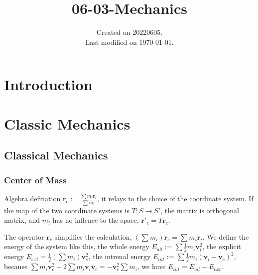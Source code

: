 \documentclass[UTF8]{../06-Physics}
\begin{document}
\title{06-03-Mechanics}
\date{Created on 20220605.\\   Last modified on \today.}
\maketitle
\tableofcontents


\chapter{Introduction}


\chapter{Classic Mechanics}

\section{Classical Mechanics}


\subsection{Center of Mass}

Algebra defination $\boldsymbol r_c := \frac{\sum m_i \boldsymbol r_i}{\sum m_i} $, it relays to the choice of the coordinate system. If the map of the two coordinate systems is $T: S \rightarrow S'$, the matrix is orthogonal matrix, and $m_i$ has no inflence to the space, $\boldsymbol r'_c = T\boldsymbol r_c$.

The operator $\boldsymbol r_c $ simplifies the calculation, $(\sum m_i)\boldsymbol r_c = \sum m_i \boldsymbol r_i$.
We define the energy of the system like this, the whole energy $E_{all} := \sum \frac{1}{2} m_i \boldsymbol {v}_i^2$, the explicit energy $E_{ext} = \frac{1}{2} (\sum  m_i) \boldsymbol {v}_c^2$, the intrenal energy $E_{int} := \sum \frac{1}{2} m_i (\boldsymbol {v}_i- \boldsymbol {v}_c)^2$, because $\sum m_i \boldsymbol{v}_c^2-2\sum m_i \boldsymbol {v}_i \boldsymbol{v}_c = -\boldsymbol{v}_c^2 \sum m_i$, we have $E_{int} = E_{all} - E_{ext}$.
\end{document}
